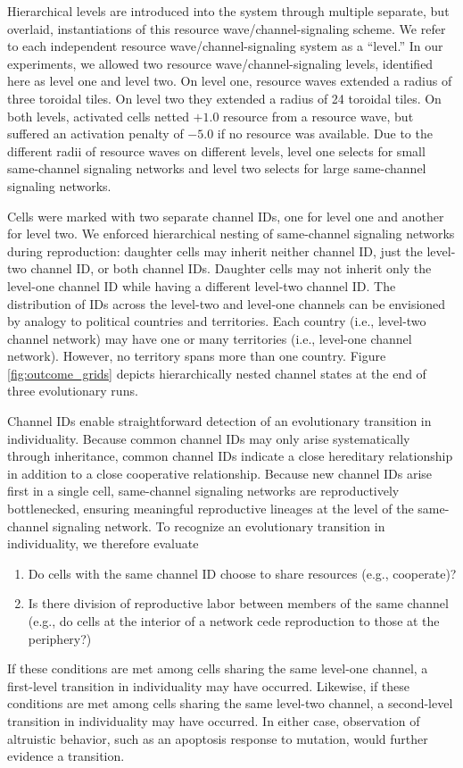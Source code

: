 Hierarchical levels are introduced into the system through multiple separate, but overlaid, instantiations of this resource wave/channel-signaling scheme.
We refer to each independent resource wave/channel-signaling system as a ``level.''
In our experiments, we allowed two resource wave/channel-signaling levels, identified here as level one and level two.
On level one, resource waves extended a radius of three toroidal tiles.
On level two they extended a radius of 24 toroidal tiles.
On both levels, activated cells netted $+1.0$ resource from a resource wave, but suffered an activation penalty of $-5.0$ if no resource was available.
Due to the different radii of resource waves on different levels, level one selects for small same-channel signaling networks and level two selects for large same-channel signaling networks.

Cells were marked with two separate channel IDs, one for level one and another for level two.
We enforced hierarchical nesting of same-channel signaling networks during reproduction:
daughter cells may inherit neither channel ID, just the level-two channel ID, or both channel IDs.
Daughter cells may not inherit only the level-one channel ID while having a different level-two channel ID.
The distribution of IDs across the level-two and level-one channels can be envisioned by analogy to political countries and territories.
Each country (i.e., level-two channel network) may have one or many territories (i.e., level-one channel network).
However, no territory spans more than one country.
Figure \ref{fig:outcome_grids} depicts hierarchically nested channel states at the end of three evolutionary runs.

Channel IDs enable straightforward detection of an evolutionary transition in individuality.
Because common channel IDs may only arise systematically through inheritance, common channel IDs indicate a close hereditary relationship in addition to a close cooperative relationship.
Because new channel IDs arise first in a single cell, same-channel signaling networks are reproductively bottlenecked, ensuring meaningful reproductive lineages at the level of the same-channel signaling network.
To recognize an evolutionary transition in individuality, we therefore evaluate
\begin{enumerate}
\item Do cells with the same channel ID choose to share resources (e.g., cooperate)?
\item Is there division of reproductive labor between members of the same channel (e.g., do cells at the interior of a network cede reproduction to those at the periphery?)
\end{enumerate}
If these conditions are met among cells sharing the same level-one channel, a first-level transition in individuality may have occurred.
Likewise, if these conditions are met among cells sharing the same level-two channel, a second-level transition in individuality may have occurred.
In either case, observation of altruistic behavior, such as an apoptosis response to mutation, would further evidence a transition.

